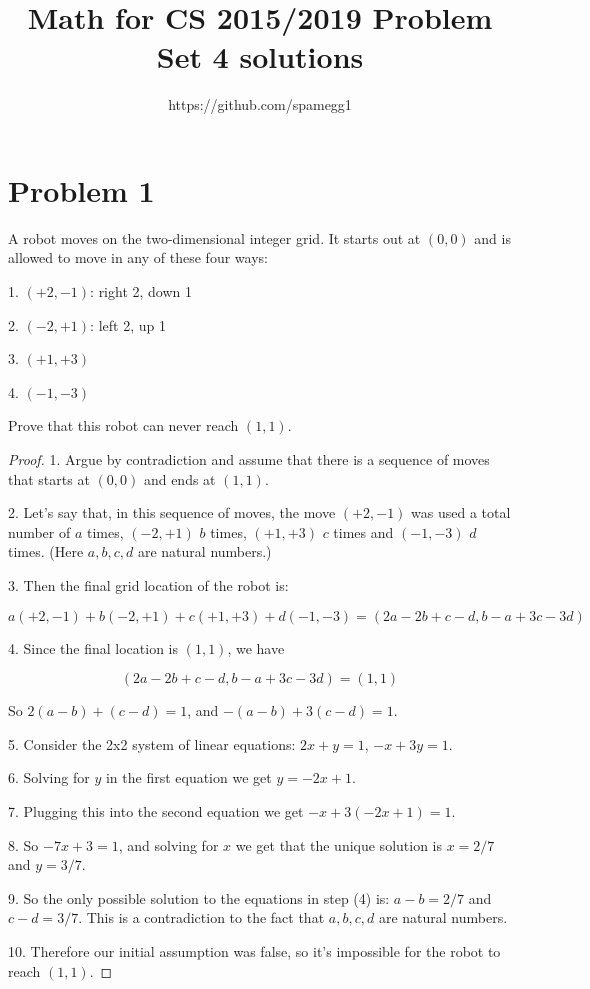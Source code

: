 \documentclass[14pt]{extarticle}
\title{Math for CS 2015/2019 Problem Set 4 solutions}
\author{https://github.com/spamegg1}
\begin{document}
\maketitle
\tableofcontents

\section{Problem 1}
A robot moves on the two-dimensional integer grid. It starts out at $(0,0)$ and is allowed to move in any of these four ways:

1. $(+2, -1)$: right 2, down 1

2. $(-2, +1)$: left 2, up 1

3. $(+1, +3)$

4. $(-1, -3)$

Prove that this robot can never reach $(1, 1)$.
\begin{proof}
1. Argue by contradiction and assume that there is a sequence of moves that starts at $(0,0)$ and ends at $(1,1)$.

2. Let's say that, in this sequence of moves, the move $(+2, -1)$ was used a total number of $a$ times, $(-2, +1)$ $b$ times, $(+1, +3)$ $c$ times and $(-1, -3)$ $d$ times. (Here $a,b,c,d$ are natural numbers.)

3. Then the final grid location of the robot is:

$$
a(+2, -1) + b(-2, +1) + c(+1, +3) + d(-1, -3) = (2a-2b+c-d, b-a+3c-3d)
$$

4. Since the final location is $(1,1)$, we have

$$
(2a-2b+c-d, b-a+3c-3d) = (1,1)
$$

So $2(a - b) + (c - d) = 1$, and $-(a - b) + 3(c - d) = 1$.

5. Consider the 2x2 system of linear equations: $2x + y = 1$, $-x + 3y = 1$.

6. Solving for $y$ in the first equation we get $y = -2x + 1$. 

7. Plugging this into the second equation we get $-x + 3(-2x+1) = 1$. 

8. So $-7x + 3 = 1$, and solving for $x$ we get that the unique solution is $x = 2/7$ and $y = 3/7$.

9. So the only possible solution to the equations in step (4) is: $a - b = 2/7$ and $c - d = 3/7$. This is a contradiction to the fact that $a,b,c,d$ are natural numbers.

10. Therefore our initial assumption was false, so it's impossible for the robot to reach $(1,1)$.
\end{proof}
\end{document}

